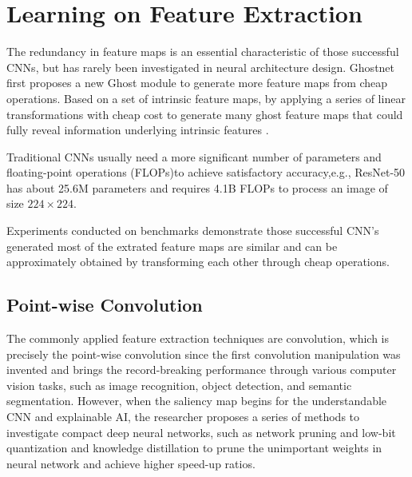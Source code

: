 \section{Learning on Feature Extraction}

The redundancy in feature maps is an essential characteristic of those successful CNNs\cite{20}\cite{wideres}\cite{31}\cite{32}, but has rarely been investigated in neural architecture design. Ghostnet \cite{19}  first proposes a new Ghost module to generate more feature maps from cheap operations. Based on a set of intrinsic feature maps, by applying a series of linear transformations with cheap cost to generate many ghost feature maps that could fully reveal information underlying intrinsic features \cite{19}.

Traditional CNNs usually need a more significant number of parameters and floating-point operations (FLOPs)to achieve satisfactory accuracy,e.g., ResNet-50  \cite{20}
has about 25.6M parameters and requires 4.1B FLOPs to process an image of size $224\times224$.

Experiments conducted on benchmarks demonstrate those successful CNN's \cite{20}\cite{wideres}\cite{31}\cite{32} generated most of the extrated feature maps are similar and can be approximately obtained by transforming each other through cheap operations\cite{19}.

\subsection{ Point-wise Convolution }

The commonly applied feature extraction techniques are convolution, which is precisely the point-wise convolution since the first convolution manipulation was invented and brings the record-breaking performance through various computer vision tasks, such as image recognition, object detection, and semantic segmentation.
However, when the saliency map begins for the understandable CNN and explainable AI, the researcher proposes a series of methods to investigate compact deep neural networks, such as network pruning and low-bit quantization and knowledge distillation to prune the unimportant weights in neural network and achieve higher speed-up ratios.

